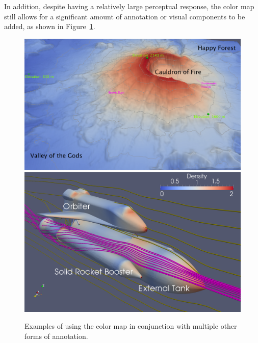 \documentclass{llncs}
\begin{document}


In addition, despite having a relatively large perceptual response, the
color map still allows for a significant amount of annotation or visual
components to be added, as shown in Figure~\ref{fig:AnnotationExamples}.



\begin{figure}
  \centering
  \includegraphics[height=0.31\linewidth]{images/AnnotationExample}
  \includegraphics[height=0.31\linewidth]{images/ShuttleExample}
  \caption{Examples of using the color map in conjunction with multiple
    other forms of annotation.}
  \label{fig:AnnotationExamples}
\end{figure}
\end{document}
